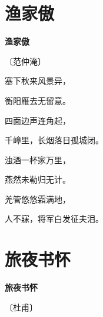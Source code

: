\documentclass[12pt,UTF-8,openany,fontset=none]{ctexbook}
\begin{document}
\vspace{8pt}
\clearpage

\section{渔家傲}


\begin{center}
    {\bfseries 渔家傲}

    \vspace{18pt}

    \begin{large}\xuwen
        〔范仲淹〕
    \end{large}

\end{center}

    \vspace{18pt}  %

\begin{center}
    \begin{Large}

        塞下秋来风景异，

        衡阳雁去无留意。

        四面边声连角起，

        千嶂里，长烟落日孤城闭。

        \vspace{18pt}  %

        浊酒一杯家万里，

        燕然未勒归无计。

        羌管悠悠霜满地，

        人不寐，将军白发征夫泪。

    \end{Large}

\end{center}

\vspace{8pt}
\clearpage

\section{旅夜书怀}


\begin{center}
    {\bfseries 旅夜书怀}

    \vspace{18pt}

    \begin{large}\xuwen
        〔杜甫〕
    \end{large}

\end{center}
\end{document}
